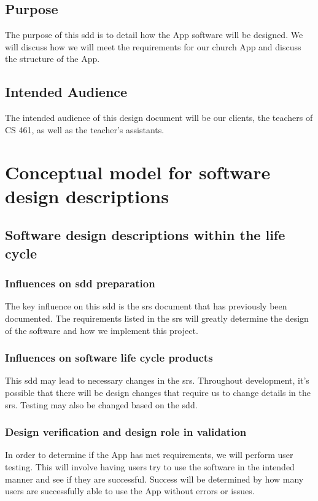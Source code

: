 \documentclass[letterpaper,10pt,draftclsnofoot,onecolumn,titlepage]{IEEEtran}
\begin{document}
		\subsection{Purpose}
			The purpose of this \gls{sdd} is to detail how the \gls{App} software will be designed.
			We will discuss how we will meet the requirements for our church \gls{App} and discuss the structure of the \gls{App}.
		\subsection{Intended Audience}
			The intended audience of this design document will be our clients, the teachers of CS 461, as well as the teacher's assistants.

		\printglossaries


	\section{Conceptual model for software design descriptions}

		\subsection{Software design descriptions within the life cycle}

			\subsubsection{Influences on \gls{sdd} preparation}
				The key influence on this \gls{sdd} is the \gls{srs} document that has previously been documented.
				The requirements listed in the \gls{srs} will greatly determine the design of the software and how we implement this project.

			\subsubsection{Influences on software life cycle products}
				This \gls{sdd} may lead to necessary changes in the \gls{srs}.
				Throughout development, it's possible that there will be design changes that require us to change details in the \gls{srs}.
				Testing may also be changed based on the \gls{sdd}.

			\subsubsection{Design verification and design role in validation}
				In order to determine if the \gls{App} has met requirements, we will perform user testing.
				This will involve having users try to use the software in the intended manner and see if they are successful.
				Success will be determined by how many users are successfully able to use the \gls{App} without errors or issues.
\end{document}
